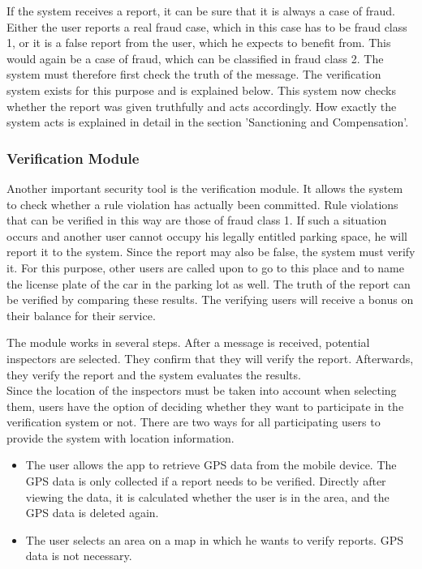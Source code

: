 \documentclass[
a4paper,     %
titlepage,   %
14pt         %
]{scrartcl}  %
\theoremstyle{mystyle}
\begin{document}
If the system receives a report, it can be sure that it is always a case of fraud. Either the user reports a real fraud case, which in this case has to be fraud class 1, or it is a false report from the user, which he expects to benefit from. This would again be a case of fraud, which can be classified in fraud class 2. The system must therefore first check the truth of the message. The verification system exists for this purpose and is explained below. This system now checks whether the report was given truthfully and acts accordingly. How exactly the system acts is explained in detail in the section 'Sanctioning and Compensation'.

\subsubsection{Verification Module} Another important security tool is the verification module. It allows the system to check whether a rule violation has actually been committed. Rule violations that can be verified in this way are those of fraud class 1. If such a situation occurs and another user cannot occupy his legally entitled parking space, he will report it to the system. Since the report may also be false, the system must verify it. For this purpose, other users are called upon to go to this place and to name the license plate of the car in the parking lot as well. The truth of the report can be verified by comparing these results. The verifying users will receive a bonus on their balance for their service.

The module works in several steps. After a message is received, potential inspectors are selected. They confirm that they will verify the report. Afterwards, they verify the report and the system evaluates the results. \\

Since the location of the inspectors must be taken into account when selecting them, users have the option of deciding whether they want to participate in the verification system or not. There are two ways for all participating users to provide the system with location information. 
\begin{itemize}
\item The user allows the app to retrieve GPS data from the mobile device. The GPS data is only collected if a report needs to be verified. Directly after viewing the data, it is calculated whether the user is in the area, and the GPS data is deleted again.
\item The user selects an area on a map in which he wants to verify reports. GPS data is not necessary.
\end{itemize}
\end{document}

